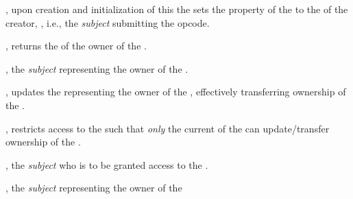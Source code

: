 \begin{code}
  \begin{constructor}
    \item {}, upon creation and initialization of this
       the  sets the 
      property of the  to the  of the
       creator, , i.e., the \emph{subject}
      submitting the  opcode.
  \end{constructor}

  \begin{functions}
    \item {}, returns the  of the owner of
      the .

      \begin{returns}
        \item {}, the \emph{subject} representing the owner of
          the .
      \end{returns}

    \item {}, updates the 
      representing the owner of the , effectively transferring
      ownership of the .

      \begin{modifiers}
        \item {}, restricts access to the
           such that \emph{only} the current  of the
           can update/transfer ownership of the .
      \end{modifiers}

      \begin{parameters}
        \item {}, the \emph{subject} who is to be granted access
          to the .
      \end{parameters}

      \begin{returns}
        \item {}, the \emph{subject} representing the owner of
          the 
      \end{returns}
  \end{functions}
\end{code}
